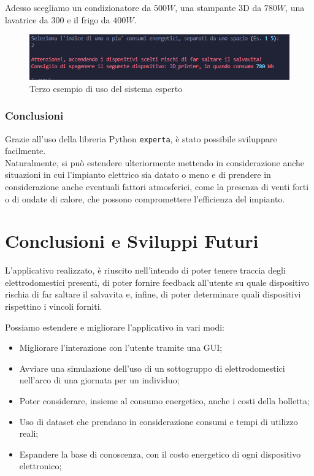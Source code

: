 \documentclass[12pt, letterpaper]{article}
\begin{document}
\noindent Adesso scegliamo un condizionatore da $500W$, una stampante 3D da $780W$, una
lavatrice da $300$ e il frigo da $400W$.

\begin{figure}[h]
      \centering
      \includegraphics[scale=0.8]{sistema-esperto-esempio-3.png}
      \caption{Terzo esempio di uso del sistema esperto}
\end{figure}

\subsubsection{Conclusioni}

Grazie all'uso della libreria Python \texttt{experta}, è stato possibile sviluppare facilmente. \\

\noindent Naturalmente, si può estendere ulteriormente mettendo in considerazione anche situazioni in cui
l'impianto elettrico sia datato o meno e di prendere in considerazione anche
eventuali fattori atmosferici, come la presenza di venti forti o di ondate di calore, che
possono compromettere l'efficienza del impianto.

\newpage

\section{Conclusioni e Sviluppi Futuri}

L'applicativo realizzato, è riuscito nell'intendo di poter tenere traccia degli elettrodomestici
presenti, di poter fornire feedback all'utente su quale dispositivo rischia di far saltare il salvavita
e, infine, di poter determinare quali dispositivi rispettino i vincoli forniti.

\noindent Possiamo estendere e migliorare l'applicativo in vari modi:
\begin{itemize}
      \item Migliorare l'interazione con l'utente tramite una GUI;
      \item Avviare una simulazione dell'uso di un sottogruppo di elettrodomestici
            nell'arco di una giornata per un individuo;
      \item Poter considerare, insieme al consumo energetico, anche i costi della bolletta;
      \item Uso di dataset che prendano in considerazione consumi e tempi di utilizzo reali;
      \item Espandere la base di conoscenza, con il costo energetico di ogni dispositivo elettronico;
\end{itemize}
\end{document}
